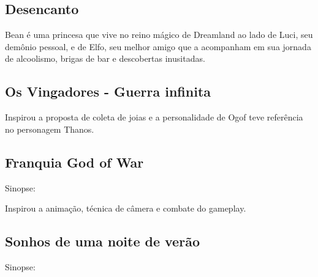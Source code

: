 \subsection{Desencanto}
Bean é uma princesa que vive no reino mágico de Dreamland ao lado de Luci, seu demônio pessoal, e de Elfo, seu melhor amigo que a acompanham em sua jornada de alcoolismo, brigas de bar e descobertas inusitadas.

\subsection{Os Vingadores - Guerra infinita}
Inspirou a proposta de coleta de joias e a personalidade de Ogof teve referência no personagem Thanos.
\subsection{Franquia God of War}
Sinopse:

Inspirou a animação, técnica de câmera e combate do gameplay.
\subsection{Sonhos de uma noite de verão}
Sinopse:

